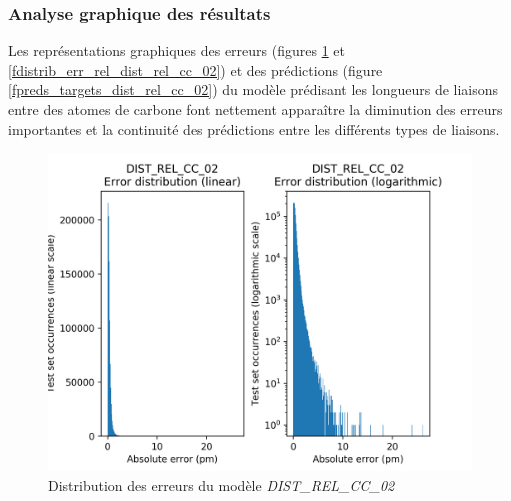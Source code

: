 \subsubsection{Analyse graphique des résultats}

\par Les représentations graphiques des erreurs (figures \ref{fdistrib_err_dist_rel_cc_02} et \ref{fdistrib_err_rel_dist_rel_cc_02}) et des prédictions (figure \ref{fpreds_targets_dist_rel_cc_02}) du modèle prédisant les longueurs de liaisons entre des atomes de carbone font nettement apparaître la diminution des erreurs importantes et la continuité des prédictions entre les différents types de liaisons.


\begin{figure}
	\centering
	
	\includegraphics[scale=0.8]{../figures/DIST_REL_CC_02/DIST_REL_CC_02_distrib_rmse_val.png}	
	
	\caption{Distribution des erreurs du modèle \emph{DIST\_REL\_CC\_02}}
	\label{fdistrib_err_dist_rel_cc_02}
\end{figure}
